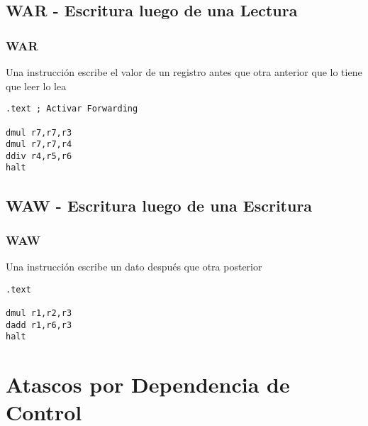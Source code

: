 \documentclass{beamer}
\begin{document}
\subsection{WAR - Escritura luego de una Lectura}
\begin{frame}[fragile]
\frametitle{WAR}
Una instrucción escribe el valor de un registro antes que otra anterior que lo tiene que leer lo lea
\begin{block}{}
\begin{lstlisting}[language=WinMIPS64,basicstyle=\ttfamily,keywordstyle=\color{blue}]
.text ; Activar Forwarding

dmul r7,r7,r3
dmul r7,r7,r4
ddiv r4,r5,r6
halt
\end{lstlisting}
\end{block}

\end{frame}


\subsection{WAW - Escritura luego de una Escritura}
\begin{frame}[fragile]
\frametitle{WAW}
Una instrucción escribe un dato después que otra posterior
\begin{block}{}
\begin{lstlisting}[language=WinMIPS64,basicstyle=\ttfamily,keywordstyle=\color{blue}]
.text

dmul r1,r2,r3
dadd r1,r6,r3
halt
\end{lstlisting}
\end{block}

\end{frame}

\section{Atascos por Dependencia de Control}
\end{document}
